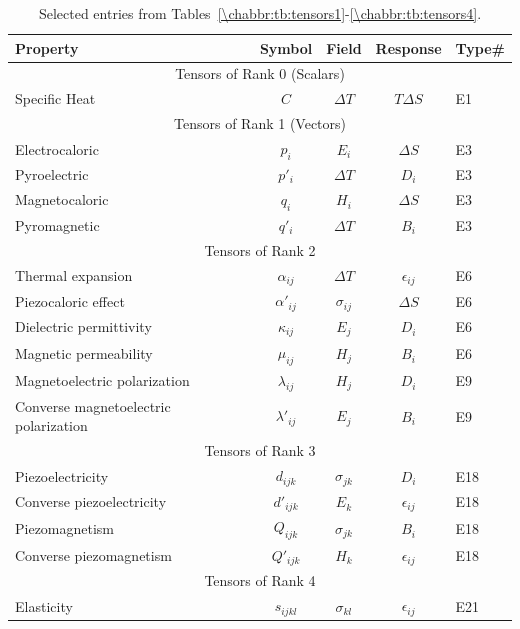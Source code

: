 \begin{table}[h]
\centering\leavevmode
\begin{tabular}{|l|c|c|c|l|}
\hline
Property   &  Symbol   &  Field & Response & Type\#  \\
\hline
\hline
\multicolumn{5}{|c|}{Tensors of Rank 0 (Scalars)}\\
\hline
Specific Heat   &   $C$   & $\Delta T$ & $T\Delta S$ &   E1\\
\hline
\multicolumn{5}{|c|}{Tensors of Rank 1 (Vectors)}\\
\hline
Electrocaloric  &  $p_i$  & $E_i$ & $\Delta S$ & E3\\
Pyroelectric  &  $p'_i$  & $\Delta T$ & $D_i$ & E3\\
Magnetocaloric & $q_i$  &  $H_i$ & $\Delta S$ & E3\\
Pyromagnetic & $q'_i$  &  $\Delta T$ & $B_i$ & E3\\
\hline
\multicolumn{5}{|c|}{Tensors of Rank 2}\\
\hline
Thermal expansion  & $\alpha_{ij}$  & $\Delta T$ & $\epsilon_{ij}$ & E6\\
Piezocaloric effect  & $\alpha'_{ij}$  & $\sigma_{ij}$ & $\Delta S$ & E6\\
Dielectric permittivity & $\kappa_{ij}$  & $E_j$ & $D_i$ &  E6\\
Magnetic permeability & $\mu_{ij}$ & $H_j$ & $B_i$ & E6\\
Magnetoelectric polarization & $\lambda_{ij}$ & $H_j$ & $D_i$  & E9\\
Converse magnetoelectric polarization & $\lambda'_{ij}$ & $E_j$ & $B_i$  & E9\\
\hline
\multicolumn{5}{|c|}{Tensors of Rank 3}\\
\hline
Piezoelectricity  &  $d_{ijk}$  & $\sigma_{jk}$ & $D_i$ &  E18\\
Converse piezoelectricity  &  $d'_{ijk}$  & $E_k$ & $\epsilon_{ij}$ &  E18\\
Piezomagnetism &  $Q_{ijk}$  & $\sigma_{jk}$ & $B_i$ & E18\\
Converse piezomagnetism &  $Q'_{ijk}$  & $H_{k}$ & $\epsilon_{ij}$ & E18\\
\hline
\multicolumn{5}{|c|}{Tensors of Rank 4}\\
\hline
Elasticity  &  $s_{ijkl}$  & $\sigma_{kl}$ & $\epsilon_{ij}$  & E21\\
\hline
\end{tabular}
\caption{Selected entries from Tables~\ref{\chabbr:tb:tensors1}-\ref{\chabbr:tb:tensors4}.}
\label{\chabbr:tb:small}
\end{table}

